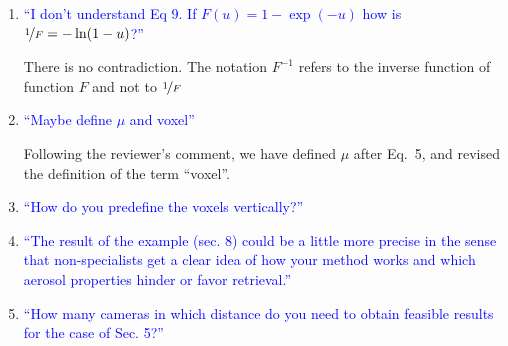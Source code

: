 \documentclass[12pt]{article}
\begin{document}
\begin{enumerate}

\item \textcolor{blue}{``I don’t understand Eq 9. If $F(u) =
    1-\exp(-u)$ how is $\nicefrac{1}{F} = -\ln(1-u)$?''}

  {There is no contradiction. The notation $F^{-1}$ refers to the
    inverse function of function $F$ and not to $\nicefrac{1}{F}$}

\item \textcolor{blue}{ ``Maybe define $\mu$ and voxel''}

  {Following the reviewer's comment, we have defined $\mu$ after
    Eq.~5, and revised the definition of the term ``voxel''. }


\item \textcolor{blue}{ ``How do you predefine the voxels
    vertically?''}

  {}


\item \textcolor{blue}{ ``The result of the example (sec. 8) could be
    a little more precise in the sense that non-specialists get a
    clear idea of how your method works and which aerosol properties
    hinder or favor retrieval.''}

  {}


\item \textcolor{blue}{ ``How many cameras in which distance do you
    need to obtain feasible results for the case of Sec. 5?''}

  {}

\end{enumerate}
\end{document}

